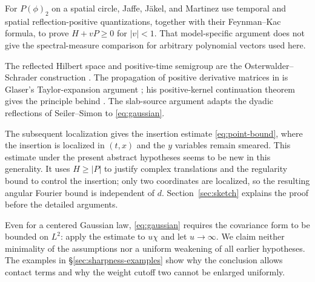 For $P(\phi)_2$ on a spatial circle, Jaffe, J\"akel, and Martinez
\cite[Proposition~VI.1 and (VI.4)--(VI.5)]{JJM} use temporal and spatial
reflection-positive quantizations, together with their Feynman--Kac
formula, to prove $H+vP\geq0$ for $|v|<1$. That model-specific argument
does not give the spectral-measure comparison for arbitrary polynomial
vectors used here.

The reflected Hilbert space and positive-time semigroup are the
Osterwalder--Schrader construction \cite[\S4.1, (4.3)--(4.9)]{OS}.
The propagation of positive derivative matrices in
 is Glaser's Taylor-expansion argument
\cite[\S3, p.~14]{Glaser1969}; his positive-kernel continuation theorem
\cite[Theorem~A]{Glaser} gives the principle behind
. The slab-source argument adapts the
dyadic reflections of Seiler--Simon
\cite[Theorems~4.3 and~7.1]{SeilerSimon} to \eqref{eq:gaussian}.

The subsequent localization gives the insertion estimate
\eqref{eq:point-bound}, where the insertion is localized in $(t,x)$
and the $y$ variables remain smeared. This estimate under the present
abstract hypotheses seems to be new in this generality. It uses
$H\geq|P|$ to justify complex translations and the regularity bound
to control the insertion; only two coordinates are localized, so the
resulting angular Fourier bound is independent of $d$.
Section~\ref{sec:sketch} explains the proof before the detailed arguments.

Even for a centered Gaussian law, \eqref{eq:gaussian} requires the
covariance form to be bounded on $L^2$: apply the estimate to $u\chi$
and let $u\to\infty$. We claim neither
minimality of the assumptions nor a uniform weakening of all earlier
hypotheses. The examples in \S\ref{sec:sharpness-examples} show why the
conclusion allows contact terms and why the weight cutoff two cannot
be enlarged uniformly.


